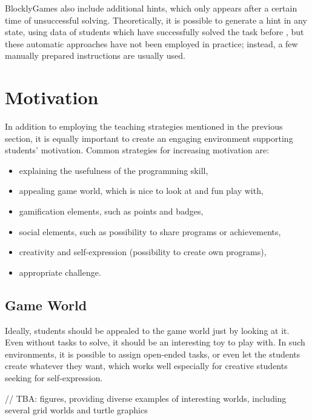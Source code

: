 \documentclass[
    digital,    %
    oneside,    %
    color,
    11pt,
    nocover,
    notable,
    nolof,
    nolot,
    final
]{fithesis3}
\begin{document}
BlocklyGames also include additional hints,
  which only appears after a certain time of unsuccessful solving.
Theoretically, it is possible to generate a hint in any state,
  using data of students which have successfully solved the task before
  \cite{generating-hints},
  but these automatic approaches have not been employed in practice;
  instead, a few manually prepared instructions are usually used.


\section{Motivation}
\label{sec:motivation}

In addition to employing the teaching strategies mentioned in the previous section,
  it is equally important to create an engaging environment supporting students’ motivation. Common strategies for increasing motivation are:

\begin{itemize}
\item explaining the usefulness of the programming skill,
\item appealing game world, which is nice to look at and fun play with,
\item gamification elements, such as points and badges,
\item social elements, such as possibility to share programs or achievements,
\item creativity and self-expression (possibility to create own programs),
\item appropriate challenge.
\end{itemize}


\subsection{Game World}
\label{sec:motivation.game-world}
Ideally, students should be appealed to the game world just by looking at it.
Even without tasks to solve,
  it should be an interesting toy to play with.
In such environments, it is possible to assign open-ended tasks,
  or even let the students create whatever they want,
  which works well especially for creative students seeking for self-expression.

// TBA: figures, providing diverse examples of interesting worlds, including several grid worlds and turtle graphics
\end{document}
